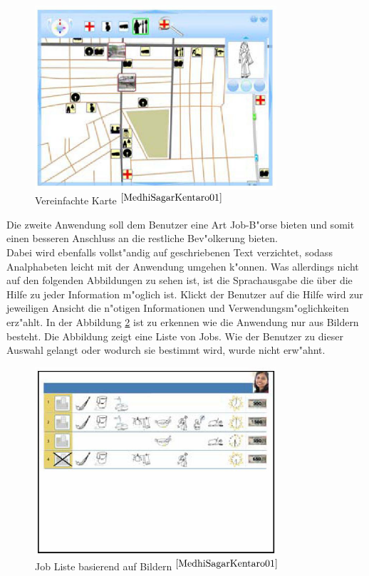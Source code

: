 \begin{figure}[h]
	\centering
		\includegraphics[width=0.8\textwidth]{Daten/map_simple.PNG}
	\caption{Vereinfachte Karte $^{\ref{MedhiSagarKentaro01}}$}
	\label{fig:mapsimple}
\end{figure}
Die zweite Anwendung soll dem Benutzer eine Art Job-B"orse bieten und somit einen besseren Anschluss an die restliche Bev"olkerung bieten.\\
Dabei wird ebenfalls vollst"andig auf geschriebenen Text verzichtet, sodass Analphabeten leicht mit der Anwendung umgehen k"onnen.
Was allerdings nicht auf den folgenden Abbildungen zu sehen ist, ist die Sprachausgabe die über die Hilfe zu jeder Information m"oglich ist. Klickt der Benutzer auf die Hilfe wird zur jeweiligen Ansicht die n"otigen Informationen und Verwendungsm"oglichkeiten erz"ahlt.
In der Abbildung \ref{fig:joblist} ist zu erkennen wie die Anwendung nur aus Bildern besteht. Die Abbildung zeigt eine Liste von Jobs. Wie der Benutzer zu dieser Auswahl gelangt oder wodurch sie bestimmt wird, wurde nicht erw"ahnt.\\
\begin{figure}[h]
	\centering
		\includegraphics[width=0.80\textwidth]{Daten/job_list.PNG}
	\caption{Job Liste basierend auf Bildern $^{\ref{MedhiSagarKentaro01}}$}
	\label{fig:joblist}
\end{figure}
